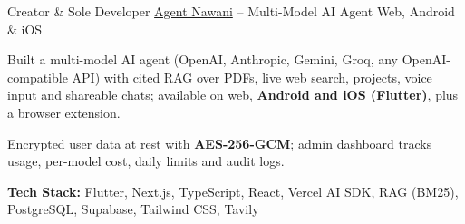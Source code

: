 
\begin{cventries}

  \cventry
    {Creator \& Sole Developer} %
    {\href{https://agentnawani.vercel.app}{Agent Nawani} -- Multi-Model AI Agent} %
    {Web, Android \& iOS} %
    {} %
    {
      \begin{cvitems}
        \item {Built a multi-model AI agent (OpenAI, Anthropic, Gemini, Groq, any OpenAI-compatible API) with cited RAG over PDFs, live web search, projects, voice input and shareable chats; available on web, \textbf{Android and iOS (Flutter)}, plus a browser extension.}
        \item {Encrypted user data at rest with \textbf{AES-256-GCM}; admin dashboard tracks usage, per-model cost, daily limits and audit logs.}
        \item {\textbf{Tech Stack:} Flutter, Next.js, TypeScript, React, Vercel AI SDK, RAG (BM25), PostgreSQL, Supabase, Tailwind CSS, Tavily}
      \end{cvitems}
    }

\end{cventries}